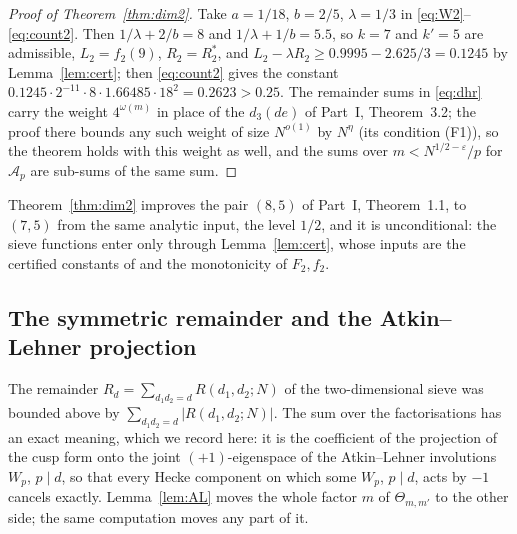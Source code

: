 ﻿\documentclass[11pt]{amsart}
\theoremstyle{remark}
\newcommand{\cA}{\mathcal{A}}
\newcommand{\e}{\varepsilon}
\begin{document}
\begin{proof}[Proof of Theorem~\ref{thm:dim2}]
Take $a=1/18$, $b=2/5$, $\lambda=1/3$ in \eqref{eq:W2}--\eqref{eq:count2}. Then $1/\lambda+2/b=8$ and $1/\lambda+1/b=5.5$, so $k=7$ and $k'=5$ are admissible, $L_2=f_2(9)$, $R_2=R_2^*$, and $L_2-\lambda R_2\ge0.9995-2.625/3=0.1245$ by Lemma~\ref{lem:cert}; then \eqref{eq:count2} gives the constant $0.1245\cdot2^{-11}\cdot8\cdot1.66485\cdot18^2=0.2623>0.25$. The remainder sums in \eqref{eq:dhr} carry the weight $4^{\omega(m)}$ in place of the $d_3(de)$ of Part~I, Theorem~3.2; the proof there bounds any such weight of size $N^{o(1)}$ by $N^{\eta}$ (its condition (F1)), so the theorem holds with this weight as well, and the sums over $m<N^{1/2-\e}/p$ for $\cA_p$ are sub-sums of the same sum.
\end{proof}

Theorem~\ref{thm:dim2} improves the pair $(8,5)$ of Part~I, Theorem~1.1, to $(7,5)$ from the same analytic input, the level $1/2$, and it is unconditional: the sieve functions enter only through Lemma~\ref{lem:cert}, whose inputs are the certified constants of \cite{BB} and the monotonicity of $F_2,f_2$.

\subsection{The symmetric remainder and the Atkin--Lehner projection}\label{subsec:symrem}
The remainder $R_d=\sum_{d_1d_2=d}R(d_1,d_2;N)$ of the two-dimensional sieve was bounded above by $\sum_{d_1d_2=d}|R(d_1,d_2;N)|$. The sum over the factorisations has an exact meaning, which we record here: it is the coefficient of the projection of the cusp form onto the joint $(+1)$-eigenspace of the Atkin--Lehner involutions $W_p$, $p\mid d$, so that every Hecke component on which some $W_p$, $p\mid d$, acts by $-1$ cancels exactly. Lemma~\ref{lem:AL} moves the whole factor $m$ of $\Theta_{m,m'}$ to the other side; the same computation moves any part of it.
\end{document}

